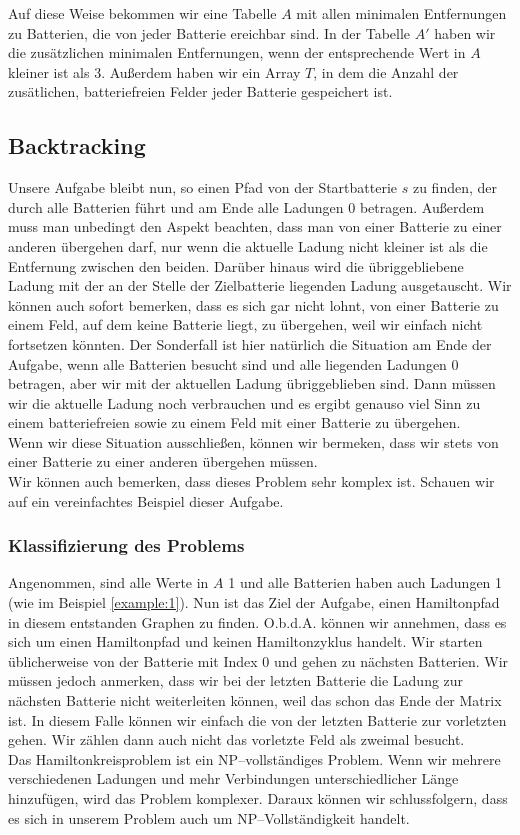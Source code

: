 \documentclass[a4paper,10pt,ngerman]{scrartcl}
\begin{document}
Auf diese Weise bekommen wir eine Tabelle $A$ mit allen minimalen Entfernungen zu Batterien, die von jeder Batterie
ereichbar sind. In der Tabelle $A'$ haben wir die zusätzlichen minimalen Entfernungen,
wenn der entsprechende Wert in $A$ kleiner ist als 3. Außerdem haben wir ein Array $T$, in dem die 
Anzahl der zusätlichen, batteriefreien Felder jeder Batterie gespeichert ist.

\subsection{Backtracking}
Unsere Aufgabe bleibt nun, so einen Pfad von der Startbatterie $s$ zu finden, der durch alle Batterien führt und am Ende alle Ladungen 0
betragen.
Außerdem muss man unbedingt den Aspekt beachten, dass man von einer Batterie zu einer anderen übergehen darf, nur wenn
die aktuelle Ladung nicht kleiner ist als die Entfernung zwischen den beiden.
Darüber hinaus wird die übriggebliebene Ladung mit der an der Stelle der Zielbatterie liegenden Ladung ausgetauscht.
Wir können auch sofort bemerken, dass es sich gar nicht lohnt, von einer Batterie zu einem Feld, auf dem keine Batterie
liegt, zu übergehen, weil wir einfach nicht fortsetzen könnten. Der Sonderfall ist hier natürlich die Situation am
Ende der Aufgabe, wenn alle Batterien besucht sind und alle liegenden Ladungen 0 betragen, aber wir mit der aktuellen Ladung übriggeblieben sind.
Dann müssen wir die aktuelle Ladung noch verbrauchen und es ergibt genauso viel Sinn zu einem batteriefreien sowie zu einem Feld mit einer Batterie
zu übergehen.\\
Wenn wir diese Situation ausschließen, können wir bermeken, dass wir stets von einer Batterie zu einer anderen übergehen müssen.\\
Wir können auch bemerken, dass dieses Problem sehr komplex ist. Schauen wir auf ein vereinfachtes Beispiel dieser Aufgabe.

\subsubsection{Klassifizierung des Problems}\label{sec:classification}
Angenommen, sind alle Werte in $A$ 1 und alle Batterien haben auch Ladungen 1 (wie im Beispiel \ref{example:1}).
Nun ist das Ziel der Aufgabe, einen Hamiltonpfad in diesem entstanden Graphen zu finden.
O.b.d.A. können wir annehmen, dass es sich um einen Hamiltonpfad und keinen Hamiltonzyklus handelt.
Wir starten üblicherweise von der Batterie mit Index 0 und gehen zu nächsten Batterien.
Wir müssen jedoch anmerken, dass wir bei der letzten Batterie
die Ladung zur nächsten Batterie nicht weiterleiten können, weil das schon das Ende der Matrix ist.
In diesem Falle können wir einfach die von der letzten Batterie zur vorletzten gehen.
Wir zählen dann auch nicht das vorletzte Feld als zweimal besucht.\\
Das Hamiltonkreisproblem ist ein NP--vollständiges Problem.
Wenn wir mehrere verschiedenen Ladungen und mehr Verbindungen unterschiedlicher Länge hinzufügen, 
wird das Problem komplexer. Daraux können wir schlussfolgern, dass es sich in unserem Problem
auch um NP--Vollständigkeit handelt.\\
\end{document}
